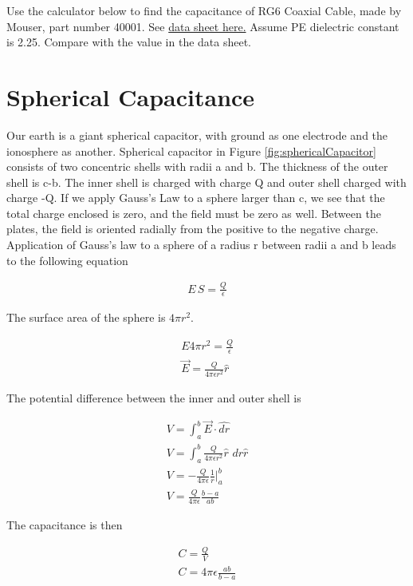 \documentclass{ximera}
\begin{document}
Use the calculator below to find the capacitance of RG6 Coaxial Cable, made by Mouser, part number 40001. See \href{https://www.tme.eu/Document/151b7fc68e82e16d70ee1f3bf3c18100/M_004-005-006-007_RG-coaxial_cables.pdf}{data sheet here.} Assume PE dielectric constant is 2.25. Compare with the value in the data sheet.


\section{Spherical Capacitance}

Our earth is a giant spherical capacitor, with ground as one electrode and the ionosphere as another.  Spherical capacitor in Figure \ref{fig:sphericalCapacitor} consists of two concentric shells with radii a and b. The thickness of the outer shell is c-b.  The inner shell is charged with charge Q and outer shell charged with charge -Q. If we apply Gauss's Law to a sphere larger than c, we see that the total charge enclosed is zero, and the field must be zero as well. Between the plates, the field is oriented radially from the positive to the negative charge. Application of Gauss's law to a sphere of a radius r between radii a and b leads to the following equation

\begin{eqnarray}
E\,S = \frac{Q}{\epsilon}
\end{eqnarray}

The surface area of the sphere is $4 \pi r^2$.


\begin{eqnarray}
E 4 \pi r^2 = \frac{Q}{\epsilon} \\
\vec{E}=\frac{Q}{4 \pi \epsilon r^2} \hat{r}
\end{eqnarray}

The potential difference between the inner and outer shell is


\begin{eqnarray}
V=\int_a^b  \vec{E} \cdot  \hat{dr} \\
V=\int_a^b \frac{Q}{4 \pi \epsilon r^2} \hat{r} \,\, dr \hat{r} \\
V=-\frac{Q}{4 \pi \epsilon} \frac{1}{r}|_a^b \\
V=\frac{Q}{4 \pi \epsilon} \frac{b-a}{ab}
\end{eqnarray}

The capacitance is then


\begin{eqnarray}
C=\frac{Q}{V} \\
C=4 \pi \epsilon \frac{ab}{b-a}
\end{eqnarray}
\end{document}
